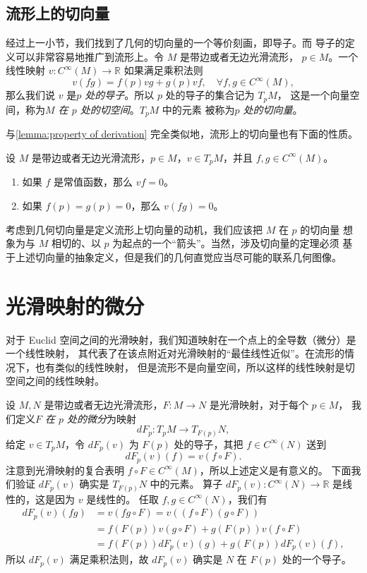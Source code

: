 \documentclass[fontset=none]{Notes}
\begin{document}
\subsection{流形上的切向量}

经过上一小节，我们找到了几何的切向量的一个等价刻画，即导子。而
导子的定义可以非常容易地推广到流形上。令 $M$ 是带边或者无边光滑流形，
$p\in M$。一个线性映射 $v:C^\infty(M)\to\mathbb{R}$ 如果满足乘积法则
\[
  v(fg)=f(p)vg+g(p)vf,\quad \forall f,g\in C^\infty(M) , 
\]
那么我们说 $v$ 是\emph{$p$ 处的导子}。所以 $p$ 处的导子的集合记为 $T_pM$，
这是一个向量空间，称为\emph{$M$ 在 $p$ 处的切空间}。$T_pM$ 中的元素
被称为\emph{$p$ 处的切向量}。

与\autoref{lemma:property of derivation} 完全类似地，流形上的切向量也有下面的性质。

\begin{lemma}[流形上切向量的性质]\label{lemma:property of tangent vector}
  设 $M$ 是带边或者无边光滑流形，$p\in M$，$v\in T_pM$，并且 $f,g\in C^\infty(M)$。
  \begin{enumerate}
    \item 如果 $f$ 是常值函数，那么 $vf=0$。
    \item 如果 $f(p)=g(p)=0$，那么 $v(fg)=0$。
  \end{enumerate}
\end{lemma}

考虑到几何切向量是定义流形上切向量的动机，我们应该把 $M$ 在 $p$ 的切向量
想象为与 $M$ 相切的、以 $p$ 为起点的一个“箭头”。当然，涉及切向量的定理必须
基于上述切向量的抽象定义，但是我们的几何直觉应当尽可能的联系几何图像。

\section{光滑映射的微分}\label{sec:differential of map}

对于 Euclid 空间之间的光滑映射，我们知道映射在一个点上的全导数（微分）是一个线性映射，
其代表了在该点附近对光滑映射的“最佳线性近似”。在流形的情况下，也有类似的线性映射，
但是流形不是向量空间，所以这样的线性映射是切空间之间的线性映射。

设 $M,N$ 是带边或者无边光滑流形，$F:M\to N$ 是光滑映射，对于每个 $p\in M$，
我们定义\emph{$F$ 在 $p$ 处的微分}为映射
\[
  dF_p:T_pM\to T_{F(p)}N  ,
\]
给定 $v\in T_pM$，令 $dF_p(v)$ 为 $F(p)$ 处的导子，其把 $f\in C^\infty(N)$
送到
\[
  dF_p(v)(f)=v(f\circ F).  
\]
注意到光滑映射的复合表明 $f\circ F\in C^\infty(M)$，所以上述定义是有意义的。
下面我们验证 $dF_p(v)$ 确实是 $T_{F(p)}N$ 中的元素。
算子 $dF_p(v):C^\infty(N)\to\mathbb{R}$ 是线性的，这是因为 $v$ 是线性的。
任取 $f,g\in C^\infty(N)$，我们有
\begin{align*}
  dF_p(v)(fg)&=v(fg\circ F)=v((f\circ F)(g\circ F))\\
  &=f(F(p))v(g\circ F)+g(F(p))v(f\circ F)\\
  &=f(F(p))dF_p(v)(g)+g(F(p))dF_p(v)(f),
\end{align*}
所以 $dF_p(v)$ 满足乘积法则，故 $dF_p(v)$ 确实是 $N$ 在 $F(p)$ 处的一个导子。
\end{document}
